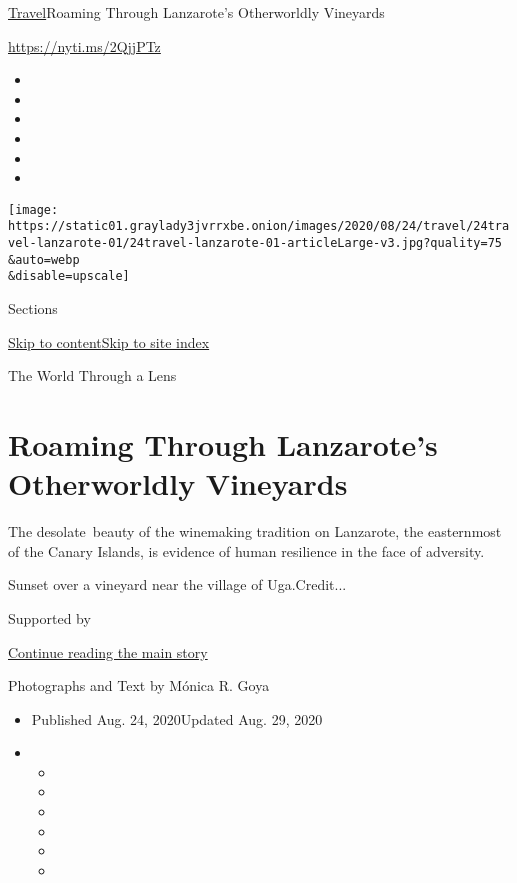 \href{/section/travel}{Travel}\textbar{}Roaming Through Lanzarote's
Otherworldly Vineyards

\url{https://nyti.ms/2QjjPTz}

\begin{itemize}
\item
\item
\item
\item
\item
\item
\end{itemize}

\texttt{[image: https://static01.graylady3jvrrxbe.onion/images/2020/08/24/travel/24travel-lanzarote-01/24travel-lanzarote-01-articleLarge-v3.jpg?quality=75\\\&auto=webp\\\&disable=upscale]}

Sections

\protect\hyperlink{site-content}{Skip to
content}\protect\hyperlink{site-index}{Skip to site index}

The World Through a Lens

\hypertarget{roaming-through-lanzarotes-otherworldly-vineyards}{%
\section{Roaming Through Lanzarote's Otherworldly
Vineyards}\label{roaming-through-lanzarotes-otherworldly-vineyards}}

The desolate~beauty of the winemaking tradition on Lanzarote, the
easternmost of the Canary Islands, is evidence of human resilience in
the face of adversity.

Sunset over a vineyard near the village of Uga.Credit...

Supported by

\protect\hyperlink{after-sponsor}{Continue reading the main story}

Photographs and Text by Mónica R. Goya

\begin{itemize}
\item
  Published Aug. 24, 2020Updated Aug. 29, 2020
\item
  \begin{itemize}
  \item
  \item
  \item
  \item
  \item
  \item
  \end{itemize}
\end{itemize}

